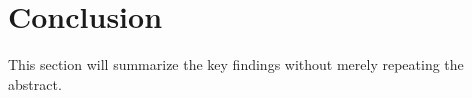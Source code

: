 \section{Conclusion}

This section will summarize the key findings without merely repeating the abstract.

